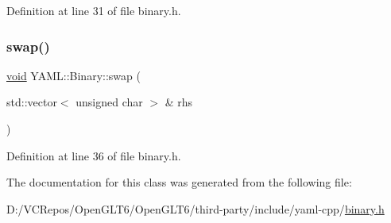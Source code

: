 Definition at line 31 of file binary.\+h.

\mbox{\label{class_y_a_m_l_1_1_binary_a7fb9a73d0230d3f9b551ce20c7d3920a}} 
\subsubsection{\texorpdfstring{swap()}{swap()}}
{\footnotesize\ttfamily \mbox{\hyperlink{glad_8h_a950fc91edb4504f62f1c577bf4727c29}{void}} Y\+A\+M\+L\+::\+Binary\+::swap (\begin{DoxyParamCaption}\item[{std\+::vector$<$ unsigned char $>$ \&}]{rhs }\end{DoxyParamCaption})\hspace{0.3cm}{\ttfamily [inline]}}



Definition at line 36 of file binary.\+h.



The documentation for this class was generated from the following file\+:\begin{DoxyCompactItemize}
\item 
D\+:/\+V\+C\+Repos/\+Open\+G\+L\+T6/\+Open\+G\+L\+T6/third-\/party/include/yaml-\/cpp/\mbox{\hyperlink{binary_8h}{binary.\+h}}\end{DoxyCompactItemize}
